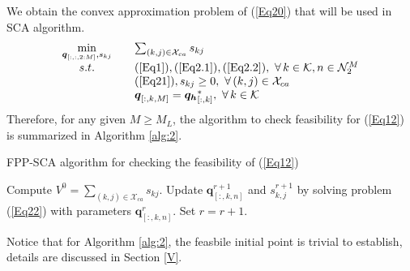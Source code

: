 \documentclass[10pt,final,conference]{IEEEtran}
\begin{document}
We obtain the convex approximation problem of (\ref{Eq20}) that will be used in SCA algorithm.
\begin{equation}\label{Eq22}
	\begin{array}{cll}
		\min\limits_{\substack{\boldsymbol{q}_{[:,:,2:M]},s_{kj}}} \quad & \sum_{(k,j)\in\mathcal{X}_{ca}}s_{kj} \\ 
		s.t. \quad & (\ref{Eq1}),(\ref{Eq2.1}),(\ref{Eq2.2}),\ \forall\,k\in\mathcal{K},n\in\mathcal{N}_2^M \\
		& (\ref{Eq21}),s_{kj} \geq 0,\ \forall\,(k,j)\in \mathcal{X}_{ca} \\
		& \boldsymbol{q}_{[:,k,M]}=\boldsymbol{q_h}^*_{[:,k]},\  \forall\,k\in\mathcal{K} 
	\end{array}
\end{equation}
Therefore, for any given $M\geq M_L$, the algorithm to check feasibility for (\ref{Eq12}) is summarized in Algorithm \ref{alg:2}.
\begin{algorithm}[!htb]
	\caption{FPP-SCA algorithm for checking the feasibility of (\ref{Eq12})}
	\label{alg:2}
	\scriptsize
	\begin{algorithmic}[1]
		\STATE Compute $V^0=\sum_{(k,j)\in\mathcal{X}_{ca}}s_{kj}$.
		\REPEAT 
		\STATE Update $\boldsymbol{q}^{r+1}_{[:,k,n]}$ and $s^{r+1}_{k,j}$ by solving problem (\ref{Eq22}) with parameters $\boldsymbol{q}^r_{[:,k,n]}$.
		\STATE Set $r=r+1$.
		\ELSE
		\ENDIF
	\end{algorithmic}
\end{algorithm}
Notice that for Algorithm \ref{alg:2}, the feasbile initial point is trivial to establish, details are discussed in Section \ref{V}.
\baselineskip
\end{document}
